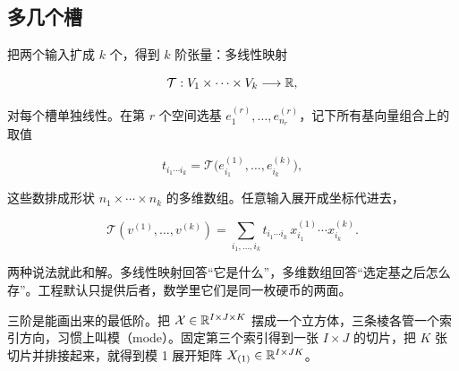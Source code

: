 \subsection{多几个槽}

把两个输入扩成 \(k\) 个，得到 \(k\) 阶张量：多线性映射

\[
\mathcal T: V_1\times\cdots\times V_k\longrightarrow\mathbb{R},
\]

对每个槽单独线性。在第 \(r\) 个空间选基 \(e^{(r)}_1,\dots,e^{(r)}_{n_r}\)，记下所有基向量组合上的取值

\[
t_{i_1\cdots i_k}=\mathcal T\bigl(e^{(1)}_{i_1},\dots,e^{(k)}_{i_k}\bigr),
\]

这些数排成形状 \(n_1\times\cdots\times n_k\) 的多维数组。任意输入展开成坐标代进去，

\[
\mathcal T(v^{(1)},\dots,v^{(k)})=\sum_{i_1,\dots,i_k}t_{i_1\cdots i_k}\,x^{(1)}_{i_1}\cdots x^{(k)}_{i_k}.
\]

两种说法就此和解。多线性映射回答``它是什么''，多维数组回答``选定基之后怎么存''。工程默认只提供后者，数学里它们是同一枚硬币的两面。

三阶是能画出来的最低阶。把 \(\mathcal X\in\mathbb{R}^{I\times J\times K}\) 摆成一个立方体，三条棱各管一个索引方向，习惯上叫模（mode）。固定第三个索引得到一张 \(I\times J\) 的切片，把 \(K\) 张切片并排接起来，就得到模 1 展开矩阵 \(X_{(1)}\in\mathbb{R}^{I\times JK}\)。

